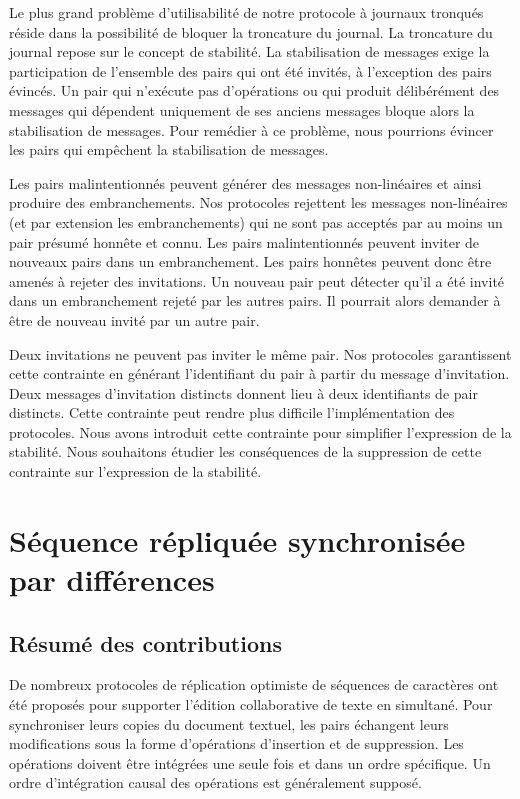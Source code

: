 Le plus grand problème d'utilisabilité de notre protocole à journaux tronqués réside dans la possibilité de bloquer la troncature du journal.
La troncature du journal repose sur le concept de stabilité.
La stabilisation de messages exige la participation de l'ensemble des pairs qui ont été invités, à l'exception des pairs évincés.
Un pair qui n'exécute pas d'opérations ou qui produit délibérément des messages qui dépendent uniquement de ses anciens messages bloque alors la stabilisation de messages.
Pour remédier à ce problème, nous pourrions évincer les pairs qui empêchent la stabilisation de messages.

Les pairs malintentionnés peuvent générer des messages non-linéaires et ainsi produire des embranchements.
Nos protocoles rejettent les messages non-linéaires (et par extension les embranchements) qui ne sont pas acceptés par au moins un pair présumé honnête et connu.
Les pairs malintentionnés peuvent inviter de nouveaux pairs dans un embranchement.
Les pairs honnêtes peuvent donc être amenés à rejeter des invitations.
Un nouveau pair peut détecter qu'il a été invité dans un embranchement rejeté par les autres pairs.
Il pourrait alors demander à être de nouveau invité par un autre pair.

Deux invitations ne peuvent pas inviter le même pair.
Nos protocoles garantissent cette contrainte en générant l'identifiant du pair à partir du message d'invitation.
Deux messages d'invitation distincts donnent lieu à deux identifiants de pair distincts.
Cette contrainte peut rendre plus difficile l'implémentation des protocoles.
Nous avons introduit cette contrainte pour simplifier l'expression de la stabilité.
Nous souhaitons étudier les conséquences de la suppression de cette contrainte sur l'expression de la stabilité.


\section{Séquence répliquée synchronisée par différences}

\subsection{Résumé des contributions}

De nombreux protocoles de réplication optimiste de séquences de caractères ont été proposés pour supporter l'édition collaborative de texte en simultané.
Pour synchroniser leurs copies du document textuel, les pairs échangent leurs modifications sous la forme d'opérations d'insertion et de suppression.
Les opérations doivent être intégrées une seule fois et dans un ordre spécifique.
Un ordre d'intégration causal des opérations est généralement supposé.

